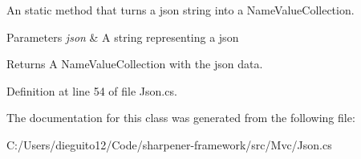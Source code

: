 An static method that turns a json string into a Name\+Value\+Collection. 


\begin{DoxyParams}{Parameters}
{\em json} & A string representing a json\\
\hline
\end{DoxyParams}
\begin{DoxyReturn}{Returns}
A Name\+Value\+Collection with the json data.
\end{DoxyReturn}


Definition at line 54 of file Json.\+cs.



The documentation for this class was generated from the following file\+:\begin{DoxyCompactItemize}
\item 
C\+:/\+Users/dieguito12/\+Code/sharpener-\/framework/src/\+Mvc/Json.\+cs\end{DoxyCompactItemize}
